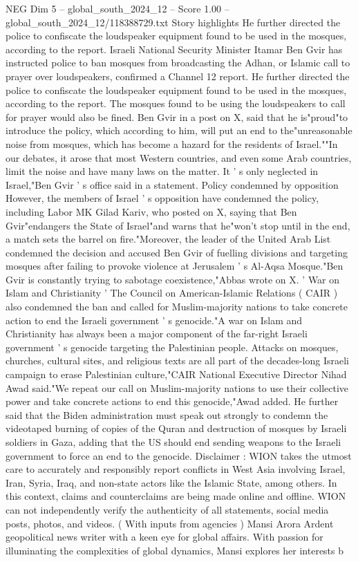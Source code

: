 \begin{textsample}{NEG Dim 5 – global\_south\_2024\_12 – Score 1.00 – global\_south\_2024\_12/118388729.txt}  \label{ex:f5_neg_409}
Story highlights He further directed the police to confiscate the loudspeaker equipment found to be used in the mosques, according to the report.
Israeli National Security Minister Itamar Ben Gvir has instructed police to ban mosques from broadcasting the Adhan, or Islamic call to prayer over loudspeakers, confirmed a Channel 12 report.
He further directed the police to confiscate the loudspeaker equipment found to be used in the mosques, according to the report.
The mosques found to be using the loudspeakers to call for prayer would also be fined.
Ben Gvir in a post on X, said that he is"proud"to introduce the policy, which according to him, will put an end to the"unreasonable noise from mosques, which has become a hazard for the residents of Israel.""In our debates, it arose that most Western countries, and even some Arab countries, limit the noise and have many laws on the matter.
It ' s only neglected in Israel,"Ben Gvir ' s office said in a statement.
Policy condemned by opposition However, the members of Israel ' s opposition have condemned the policy, including Labor MK Gilad Kariv, who posted on X, saying that Ben Gvir"endangers the State of Israel"and warns that he"won't stop until in the end, a match sets the barrel on fire."Moreover, the leader of the United Arab List condemned the decision and accused Ben Gvir of fuelling divisions and targeting mosques after failing to provoke violence at Jerusalem ' s Al-Aqsa Mosque."Ben Gvir is constantly trying to sabotage coexistence,"Abbas wrote on X. ' War on Islam and Christianity ' The Council on American-Islamic Relations ( CAIR ) also condemned the ban and called for Muslim-majority nations to take concrete action to end the Israeli government ' s genocide."A war on Islam and Christianity has always been a major component of the far-right Israeli government ' s genocide targeting the Palestinian people.
Attacks on mosques, churches, cultural sites, and religious texts are all part of the decades-long Israeli campaign to erase Palestinian culture,"CAIR National Executive Director Nihad Awad said."We repeat our call on Muslim-majority nations to use their collective power and take concrete actions to end this genocide,"Awad added.
He further said that the Biden administration must speak out strongly to condemn the videotaped burning of copies of the Quran and destruction of mosques by Israeli soldiers in Gaza, adding that the US should end sending weapons to the Israeli government to force an end to the genocide.
Disclaimer : WION takes the utmost care to accurately and responsibly report conflicts in West Asia involving Israel, Iran, Syria, Iraq, and non-state actors like the Islamic State, among others.
In this context, claims and counterclaims are being made online and offline.
WION can not independently verify the authenticity of all statements, social media posts, photos, and videos. ( With inputs from agencies ) Mansi Arora Ardent geopolitical news writer with a keen eye for global affairs.
With passion for illuminating the complexities of global dynamics, Mansi explores her interests b

\end{textsample}

